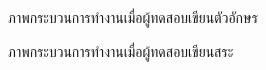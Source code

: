 \documentclass[12pt,oneside,openright,a4paper]{cpe-thai-project}
\begin{document}
        \begin{figure}[!h]
          \centering
          \setlength{\fboxrule}{0.2mm} %
          \setlength{\fboxsep}{1cm}
          \caption{ภาพกระบวนการทำงานเมื่อผู้ทดสอบเขียนตัวอักษร}\label{fig:system}                  
        \end{figure}
        \begin{figure}[!h]      \centering
          \setlength{\fboxrule}{0.2mm} %
          \setlength{\fboxsep}{1cm}
          \caption{ภาพกระบวนการทำงานเมื่อผู้ทดสอบเขียนสระ}\label{fig:system}   
         \end{figure}
        \newpage
\end{document}

